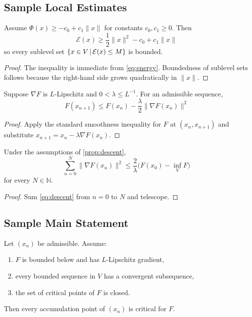 \subsection{Sample Local Estimates}
\label{ssec:local-estimates}

\begin{lemma}
\label{lem:coercive-bound}
Assume $\Phi(x)\ge -c_0+c_1\|x\|$ for constants $c_0,c_1\ge 0$. Then
\[
\mathcal{E}(x)\ge \frac12\|x\|^2-c_0+c_1\|x\|
\]
so every sublevel set $\left\{x\in V\,|\,\mathcal{E}(x)\le M\right\}$ is bounded.
\end{lemma}

\begin{proof}
The inequality is immediate from \cref{eq:energy}. Boundedness of sublevel sets follows because the right-hand side grows quadratically in $\|x\|$.
\end{proof}

\begin{proposition}
\label{prop:descent}
Suppose $\nabla F$ is $L$-Lipschitz and $0<\lambda\le L^{-1}$. For an admissible sequence,
\begin{equation}
\label{eq:descent}
F(x_{n+1})\le F(x_n)-\frac{\lambda}{2}\|\nabla F(x_n)\|^2
\end{equation}
\end{proposition}

\begin{proof}
Apply the standard smoothness inequality for $F$ at $(x_n,x_{n+1})$ and substitute $x_{n+1}=x_n-\lambda\nabla F(x_n)$.
\end{proof}

\begin{corollary}
\label{cor:grad-summable}
Under the assumptions of \cref{prop:descent},
\[
\sum_{n=0}^{N}\|\nabla F(x_n)\|^2
\le \frac{2}{\lambda}\bigl(F(x_0)-\inf_V F\bigr)
\]
for every $N\in\mathbb{N}$.
\end{corollary}

\begin{proof}
Sum \cref{eq:descent} from $n=0$ to $N$ and telescope.
\end{proof}

\subsection{Sample Main Statement}
\label{ssec:main-statement}

\begin{theorem}
\label{thm:template-convergence}
Let $(x_n)$ be admissible. Assume:
\begin{enumerate}
    \item $F$ is bounded below and has $L$-Lipschitz gradient,
    \item every bounded sequence in $V$ has a convergent subsequence,
    \item the set of critical points of $F$ is closed.
\end{enumerate}
Then every accumulation point of $(x_n)$ is critical for $F$.
\end{theorem}

